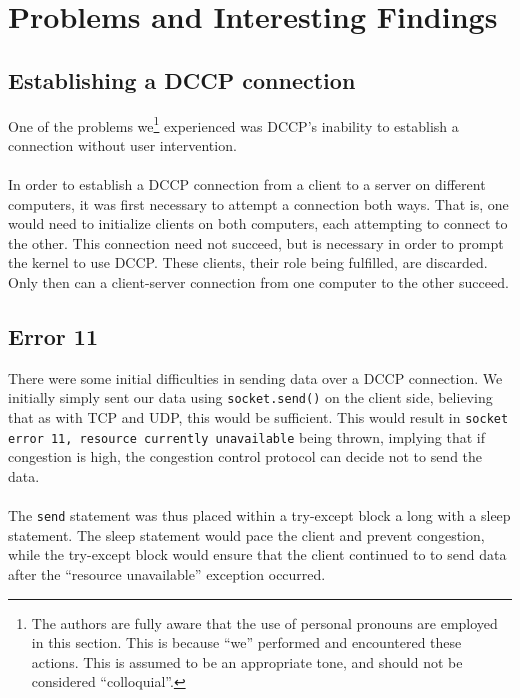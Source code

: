 \documentclass[10pt,a4paper]{article}
\begin{document}
\section{Problems and Interesting Findings}
\label{complications}

\subsection{Establishing a DCCP connection}
One of the problems we\footnote{The authors are fully aware
that the use of personal pronouns are employed in this section. This is because
``we'' performed and encountered these actions. This is assumed to be an
appropriate tone, and should not be considered ``colloquial''.} experienced was
DCCP's inability to establish a connection
without user intervention. 
\paragraph{}
In order to establish a DCCP connection from a client to
a server on different computers, it was first necessary to attempt a connection both ways. 
That is, one would need to initialize clients on both computers, each attempting
to connect
to the other. This connection need not succeed, but 
is necessary in order to prompt the kernel to use DCCP.
These clients, their role being fulfilled, are
discarded. Only then can a client-server connection from one computer to the
other succeed.

\subsection{Error 11}
There were some initial difficulties in sending data over a DCCP connection. We initially
simply sent our data using \texttt{socket.send()} on the client side, believing
that as with TCP
and UDP, this would be sufficient. This would result in \texttt{socket error
11, resource currently
unavailable} being thrown, implying that if congestion is high, the congestion
control 
protocol can decide not to send the data.
\paragraph{}
The \texttt{send} statement was thus placed within a try-except
block a long with a sleep statement. The sleep statement would pace the client
and prevent
congestion, while the try-except block would ensure that the client
continued to  to send data after the ``resource unavailable'' exception
occurred. 
\end{document}
